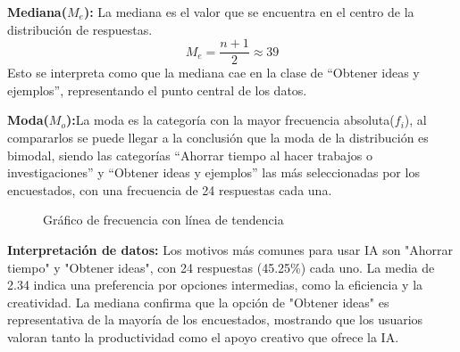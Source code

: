 \textbf{Mediana($M_e$):} La mediana es el valor que se encuentra en el centro de la distribución de respuestas.
\begin{equation*}
	M_e = \dfrac{n + 1}{2} \approx 39
\end{equation*}
Esto se interpreta como que la mediana cae en la clase de “Obtener ideas y ejemplos”, representando el punto central de los datos.

\textbf{Moda($M_o$):}La moda es la categoría con la mayor frecuencia absoluta($f_i$), al compararlos se puede llegar a la conclusión que la moda de la distribución es bimodal, siendo las categorías “Ahorrar tiempo al hacer trabajos o investigaciones” y “Obtener ideas y ejemplos” las más seleccionadas por los encuestados, con una frecuencia de 24 respuestas cada una.
\begin{figure}[H]
	\centering
	\hspace*{-1.5cm}
	\caption{Gráfico de frecuencia con línea de tendencia}
\end{figure}

\textbf{Interpretación de datos:} Los motivos más comunes para usar IA son "Ahorrar tiempo" y "Obtener ideas", con 24 respuestas (45.25\%) cada uno. La media de 2.34 indica una preferencia por opciones intermedias, como la eficiencia y la creatividad. La mediana confirma que la opción de "Obtener ideas" es representativa de la mayoría de los encuestados, mostrando que los usuarios valoran tanto la productividad como el apoyo creativo que ofrece la IA.
